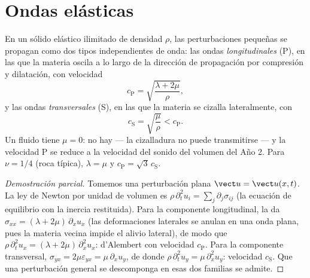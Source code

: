 \section{Ondas elásticas}

\begin{proposition}\label{prop:b3:continuum-elasticity:waves}
En un sólido elástico ilimitado de densidad $\rho$, las perturbaciones
pequeñas se propagan como dos tipos independientes de onda: las ondas
\emph{longitudinales} (P), en las que la materia oscila a lo largo de la
dirección de propagación por compresión y dilatación, con velocidad
\[
c_{\text{P}} = \sqrt{\frac{\lambda + 2\mu}{\rho}} ,
\]
y las ondas \emph{transversales} (S), en las que la materia se cizalla
lateralmente, con
\[
c_{\text{S}} = \sqrt{\frac{\mu}{\rho}} < c_{\text{P}} .
\]
Un fluido tiene $\mu = 0$: no hay  --- la cizalladura no puede
transmitirse --- y la velocidad P se reduce a la velocidad del sonido del
volumen del Año 2. Para $\nu = 1/4$ (roca típica), $\lambda = \mu$ y $c_{\text{P}} =
\sqrt3\,c_{\text{S}}$.
\end{proposition}

\begin{proof}[Demostración parcial]
Tomemos una perturbación plana $\vect u = \vect u(x, t)$. La ley de Newton
por unidad de volumen es $\rho\,\partial_t^2u_i = \sum_j\partial_j\sigma_{ij}$
(la ecuación de equilibrio con la inercia restituida). Para la componente
longitudinal, la  da $\sigma_{xx} = (\lambda +
2\mu)\,\partial_xu_x$ (las deformaciones laterales se anulan en una onda
plana, pues la materia vecina impide el alivio lateral), de modo que
$\rho\,\partial_t^2u_x = (\lambda + 2\mu)\,\partial_x^2u_x$: d'Alembert
con velocidad $c_{\text{P}}$. Para la componente transversal, $\sigma_{yx} =
2\mu\varepsilon_{yx} = \mu\,\partial_xu_y$, de donde
$\rho\,\partial_t^2u_y = \mu\,\partial_x^2u_y$: velocidad $c_{\text{S}}$.
Que una perturbación general se descomponga en esas dos familias se admite.
\end{proof}

